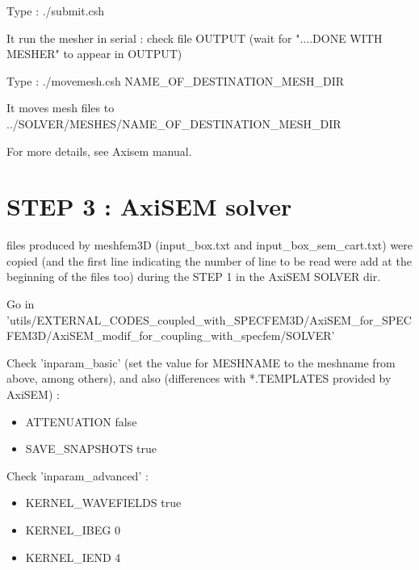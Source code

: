 \documentclass[11pt]{article}
\begin{document}
\noindent Type : ./submit.csh

\medskip

\noindent It run the mesher in serial : check file OUTPUT (wait for "....DONE WITH MESHER" to appear in OUTPUT)

\medskip

\noindent Type : ./movemesh.csh NAME\_OF\_DESTINATION\_MESH\_DIR

\medskip

\noindent It moves mesh files to ../SOLVER/MESHES/NAME\_OF\_DESTINATION\_MESH\_DIR

\medskip

\noindent For more details, see Axisem manual.

\section{STEP 3 : AxiSEM solver}

 files produced by meshfem3D (input\_box.txt and input\_box\_sem\_cart.txt) were copied (and the first line indicating the number of line to be read were add at the beginning of the files too) during the STEP 1 in the AxiSEM SOLVER dir.

\medskip

\noindent Go in {\scriptsize 'utils/EXTERNAL\_CODES\_coupled\_with\_SPECFEM3D/AxiSEM\_for\_SPECFEM3D/AxiSEM\_modif\_for\_coupling\_with\_specfem/SOLVER'}

\medskip

\noindent Check 'inparam\_basic' (set the value for MESHNAME to the meshname from above, among others), and also (differences with *.TEMPLATES provided
by AxiSEM) :

\begin{itemize}

\item[\textbullet] ATTENUATION         false
\item[\textbullet] SAVE\_SNAPSHOTS     true

\end{itemize}

\medskip

\noindent Check 'inparam\_advanced' :

\begin{itemize}

\item[\textbullet] KERNEL\_WAVEFIELDS   true
\item[\textbullet] KERNEL\_IBEG         0
\item[\textbullet] KERNEL\_IEND         4

\end{itemize}
\end{document}
